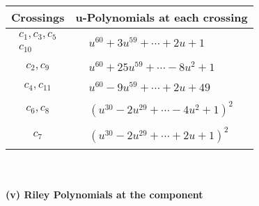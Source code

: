 \documentclass[1p]{elsarticle_modified}
\theoremstyle{definition}
\begin{document}
\begin{tabular}{m{50pt}|m{274pt}}
Crossings & \hspace{64pt}u-Polynomials at each crossing \\
\hline $$\begin{aligned}c_{1},c_{3},c_{5}\\c_{10}\end{aligned}$$&$\begin{aligned}
&u^{60}+3 u^{59}+\cdots+2 u+1
\end{aligned}$\\
\hline $$\begin{aligned}c_{2},c_{9}\end{aligned}$$&$\begin{aligned}
&u^{60}+25 u^{59}+\cdots-8 u^2+1
\end{aligned}$\\
\hline $$\begin{aligned}c_{4},c_{11}\end{aligned}$$&$\begin{aligned}
&u^{60}-9 u^{59}+\cdots+2 u+49
\end{aligned}$\\
\hline $$\begin{aligned}c_{6},c_{8}\end{aligned}$$&$\begin{aligned}
&(u^{30}-2 u^{29}+\cdots-4 u^2+1)^{2}
\end{aligned}$\\
\hline $$\begin{aligned}c_{7}\end{aligned}$$&$\begin{aligned}
&(u^{30}-2 u^{29}+\cdots+2 u+1)^{2}
\end{aligned}$\\
\hline
\end{tabular}\\~\\
\newpage\renewcommand{\arraystretch}{1}
\flushleft \textbf{(v) Riley Polynomials at the component}\newline \\
\end{document}
